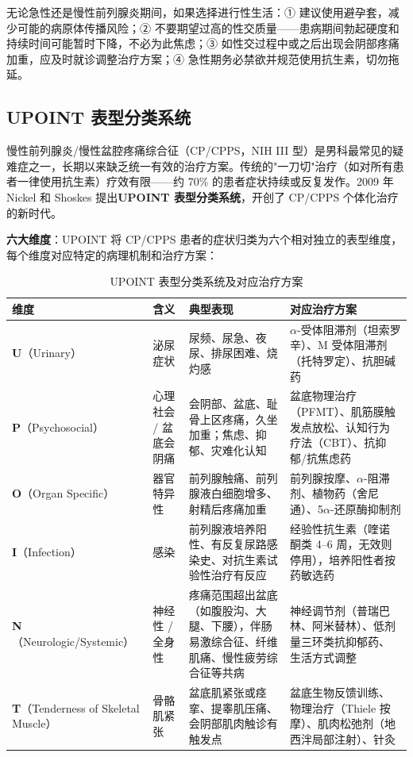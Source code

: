 \documentclass[12pt,a4paper,twoside]{ctexbook}
\begin{document}
\begin{tcolorbox}[colback=pink!5!white,colframe=red!50!black,title=贴心小叮咛]
无论急性还是慢性前列腺炎期间，如果选择进行性生活：① 建议使用避孕套，减少可能的病原体传播风险；② 不要期望过高的性交质量——患病期间勃起硬度和持续时间可能暂时下降，不必为此焦虑；③ 如性交过程中或之后出现会阴部疼痛加重，应及时就诊调整治疗方案；④ 急性期务必禁欲并规范使用抗生素，切勿拖延。
\end{tcolorbox}

\subsection{UPOINT 表型分类系统}
\label{subsec:upoint}

慢性前列腺炎/慢性盆腔疼痛综合征（CP/CPPS，NIH III 型）是男科最常见的疑难症之一，长期以来缺乏统一有效的治疗方案。传统的"一刀切"治疗（如对所有患者一律使用抗生素）疗效有限——约 70\% 的患者症状持续或反复发作。2009 年 Nickel 和 Shoskes 提出\textbf{UPOINT 表型分类系统}，开创了 CP/CPPS 个体化治疗的新时代。

\textbf{六大维度}：UPOINT 将 CP/CPPS 患者的症状归类为六个相对独立的表型维度，每个维度对应特定的病理机制和治疗方案：

\begin{table}[htbp]
\centering
\caption{UPOINT 表型分类系统及对应治疗方案}
\label{tab:upoint}
\begin{tabularx}{\textwidth}{@{}llXX@{}}
    \toprule
    \textbf{维度} & \textbf{含义} & \textbf{典型表现} & \textbf{对应治疗方案} \\
    \midrule
    \textbf{U}（Urinary） & 泌尿症状 & 尿频、尿急、夜尿、排尿困难、烧灼感 & $\alpha$-受体阻滞剂（坦索罗辛）、M 受体阻滞剂（托特罗定）、抗胆碱药 \\
    \textbf{P}（Psychosocial） & 心理社会 / 盆底会阴痛 & 会阴部、盆底、耻骨上区疼痛，久坐加重；焦虑、抑郁、灾难化认知 & 盆底物理治疗（PFMT）、肌筋膜触发点放松、认知行为疗法（CBT）、抗抑郁/抗焦虑药 \\
    \textbf{O}（Organ Specific） & 器官特异性 & 前列腺触痛、前列腺液白细胞增多、射精后疼痛加重 & 前列腺按摩、$\alpha$-阻滞剂、植物药（舍尼通）、5$\alpha$-还原酶抑制剂 \\
    \textbf{I}（Infection） & 感染 & 前列腺液培养阳性、有反复尿路感染史、对抗生素试验性治疗有反应 & 经验性抗生素（喹诺酮类 4--6 周，无效则停用），培养阳性者按药敏选药 \\
    \textbf{N}（Neurologic/Systemic） & 神经性 / 全身性 & 疼痛范围超出盆底（如腹股沟、大腿、下腰），伴肠易激综合征、纤维肌痛、慢性疲劳综合征等共病 & 神经调节剂（普瑞巴林、阿米替林）、低剂量三环类抗抑郁药、生活方式调整 \\
    \textbf{T}（Tenderness of Skeletal Muscle） & 骨骼肌紧张 & 盆底肌紧张或痉挛、提睾肌压痛、会阴部肌肉触诊有触发点 & 盆底生物反馈训练、物理治疗（Thiele 按摩）、肌肉松弛剂（地西泮局部注射）、针灸 \\
    \bottomrule
\end{tabularx}
\end{table}
\end{document}
